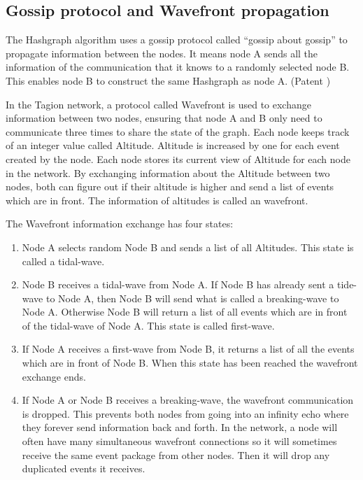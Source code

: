 \subsection{Gossip protocol and Wavefront propagation}\label{sec:wavefront}
The Hashgraph algorithm uses a gossip protocol called “gossip about gossip” to propagate information between the nodes. It means node A sends all the information of the communication that it knows to a randomly selected node B. This enables node B to construct the same Hashgraph as node A. (Patent \cite{wavefront_patent})

In the Tagion network, a protocol called Wavefront is used to exchange information between two nodes, ensuring that node A and B only need to communicate three times to share the state of the graph.
Each node keeps track of an integer value called Altitude. Altitude is increased by one for each event created by the node. Each node stores its current view of Altitude for each node in the network.
By exchanging information about the Altitude between two nodes, both can figure out if their altitude is higher and send a list of events which are in front. The information of altitudes is called an wavefront.

The Wavefront information exchange has four states:
\begin{enumerate}
 \item 
 Node A selects random Node B and sends a list of all Altitudes. This state is called a tidal-wave.
 \item 
 Node B receives a tidal-wave from Node A. If Node B has already sent a tide-wave to Node A, then Node B will send what is called a breaking-wave to Node A. Otherwise Node B will return a list of all events which are in front of the tidal-wave of Node A. This state is called first-wave.
 \item 
 If Node A receives a first-wave from Node B, it returns a list of all the events which are in front of Node B. When this state has been reached the wavefront exchange ends.
 \item 
 If Node A or Node B receives a breaking-wave, the wavefront communication is dropped. This prevents both nodes from going into an infinity echo where they forever send information back and forth.
In the network, a node will often have many simultaneous wavefront connections so it will sometimes receive the same event package from other nodes. Then it will drop any duplicated events it receives.  
\end{enumerate}

